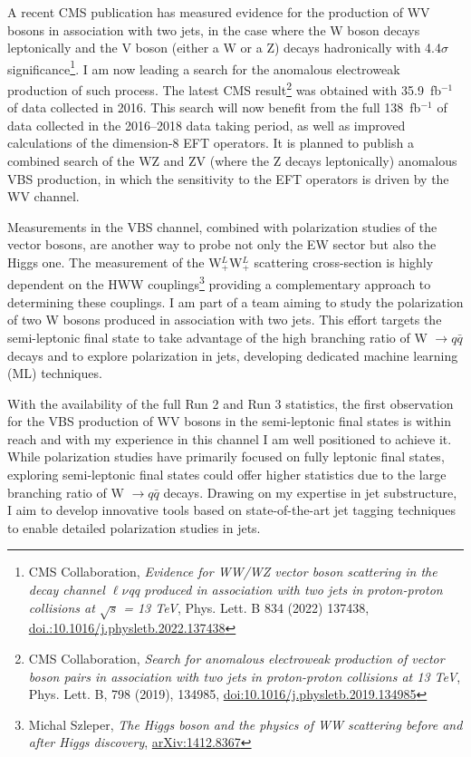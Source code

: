 {\begin{flushleft}
A recent CMS publication has measured evidence for the production of WV bosons in association with two jets, in the case where the W boson decays leptonically and the V boson (either a W or a Z) decays hadronically with 4.4$\sigma$ significance\footnote{CMS Collaboration, {\em Evidence for WW/WZ vector boson scattering in the decay channel $\ell\nu$qq produced in association with two jets in proton-proton collisions at $\sqrt{s}$ = 13 TeV}, Phys. Lett. B 834 (2022) 137438, \href{https://doi.org/10.1016/j.physletb.2022.137438}{doi.:10.1016/j.physletb.2022.137438}}. I am now leading a search for the anomalous electroweak production of such process. The latest CMS result\footnote{CMS Collaboration, {\em Search for anomalous electroweak production of vector boson pairs in association with two jets in proton-proton collisions at 13 TeV}, Phys. Lett. B, 798 (2019), 134985, \href{https://doi.org/10.1016/j.physletb.2019.134985}{doi:10.1016/j.physletb.2019.134985}} was obtained with 35.9~fb$^{-1}$ of data collected in 2016. This search will now benefit from the full 138~fb$^{-1}$ of data collected in the 2016--2018 data taking period, as well as improved calculations of the dimension-8 EFT operators. It is planned to publish a combined search of the WZ and ZV (where the Z decays leptonically) anomalous VBS production, in which the sensitivity to the EFT operators is driven by the WV channel. 

Measurements in the VBS channel, combined with polarization studies of the vector bosons, are another way to probe not only the EW sector but also the Higgs one.
The measurement of the  W$^L_+$W$^L_+$ scattering cross-section is highly dependent on the HWW couplings\footnote{Michal Szleper, {\em The Higgs boson and the physics of WW scattering before and after Higgs discovery}, \href{https://arxiv.org/pdf/1412.8367}{arXiv:1412.8367}} providing a complementary approach to determining these couplings. 
I am part of a team aiming to study the polarization of two W bosons produced in association with two jets. This effort targets the semi-leptonic final state to take advantage of the high branching ratio of W $\to q\bar{q}$ decays and to explore polarization in jets, developing dedicated machine learning (ML) techniques. 


With the availability of the full Run 2 and Run 3 statistics, the first observation for the VBS production of WV bosons in the semi-leptonic final states is within reach and with my experience in this channel I am well positioned to achieve it.
While polarization studies have primarily focused on fully leptonic final states, exploring semi-leptonic final states could offer higher statistics due to the large branching ratio of W $\to q\bar{q}$ decays. Drawing on my expertise in jet substructure, I aim to develop innovative tools based on state-of-the-art jet tagging techniques to enable detailed polarization studies in jets.
 



\end{flushleft}}
